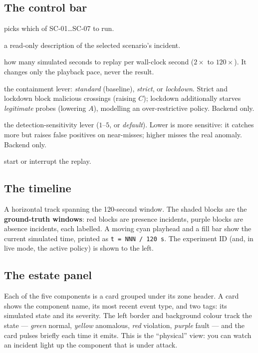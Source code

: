 \documentclass[11pt]{article}
\newcommand{\code}[1]{\texttt{\small #1}}
\begin{document}
\subsection{The control bar}
\begin{description}[leftmargin=1.4em,style=nextline]
  \item[scenario] picks which of SC-01\ldots SC-07 to run.
  \item[incident] a read-only description of the selected scenario's incident.
  \item[speed] how many simulated seconds to replay per wall-clock second
        ($2\times$ to $120\times$). It changes only the playback pace, never the
        result.
  \item[access profile] the containment lever: \emph{standard} (baseline),
        \emph{strict}, or \emph{lockdown}. Strict and lockdown block malicious
        crossings (raising $C$); lockdown additionally starves \emph{legitimate}
        probes (lowering $A$), modelling an over-restrictive policy. Backend only.
  \item[alert threshold] the detection-sensitivity lever ($1$--$5$, or
        \emph{default}). Lower is more sensitive: it catches more but raises false
        positives on near-misses; higher misses the real anomaly. Backend only.
  \item[run / stop] start or interrupt the replay.
\end{description}

\subsection{The timeline}
A horizontal track spanning the 120-second window. The shaded blocks are the
\textbf{ground-truth windows}: red blocks are presence incidents, purple blocks
are absence incidents, each labelled. A moving cyan playhead and a fill bar show
the current simulated time, printed as \code{t = NNN / 120 s}. The experiment ID
(and, in live mode, the active policy) is shown to the left.

\subsection{The estate panel}
Each of the five components is a card grouped under its zone header. A card shows
the component name, its most recent event type, and two tags: its simulated state
and its severity. The left border and background colour track the state ---
\emph{green} normal, \emph{yellow} anomalous, \emph{red} violation,
\emph{purple} fault --- and the card pulses briefly each time it emits. This is
the ``physical'' view: you can watch an incident light up the component that is
under attack.
\end{document}
